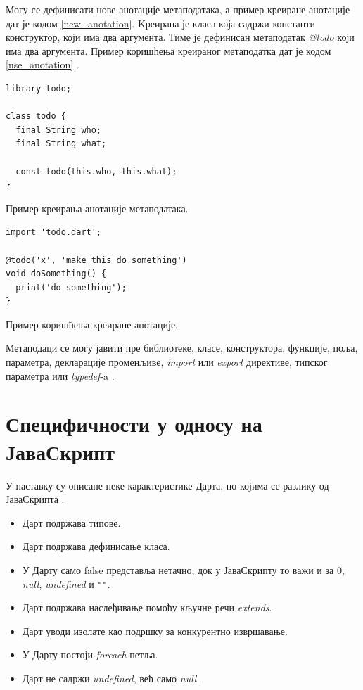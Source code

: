 \documentclass[12pt,oneside]{memoir}
\begin{document}
Могу се дефинисати нове анотације метаподатака, а пример креиране анотације дат је кодом \ref{new_anotation}. Kреирана је класа која садржи константи конструктор, који има два аргумента. Тиме је дефинисан метаподатак \textit{@todo} који има два аргумента. Пример коришћења креираног метаподатка дат је кодом \ref{use_anotation} \cite{dart, dart1}.

\begin{listing}
\begin{verbatim}
library todo;

class todo {
  final String who;
  final String what;

  const todo(this.who, this.what);
}
\end{verbatim}
\caption{Пример креирања анотације метаподатака.}
\label{new_anotation}
\end{listing}

\begin{listing}
\begin{verbatim}
import 'todo.dart';

@todo('x', 'make this do something')
void doSomething() {
  print('do something');
}
\end{verbatim}
\caption{Пример коришћења креиране анотације.}
\label{use_anotation}
\end{listing}
Метаподаци се могу јавити пре библиотеке, класе, конструктора, функције, поља, параметра, декларације променљиве, \textit{import} или \textit{export} директиве, типског параметра или \textit{typedef}-a \cite{dart, dart1}.
\section{Специфичности у односу на ЈаваСкрипт}
\label{specificnosti}
У наставку су описане неке карактеристике Дарта, по којима се разлику од ЈаваСкрипта \cite{dart, dart1}.
\begin{itemize}
\item Дарт подржава типове.
\item Дарт подржава дефинисање класа.
\item У Дарту само false представља нетачно, док у ЈаваСкрипту то важи и за 0, \textit{null}, \textit{undefined} и \verb|""|.
\item Дарт подржава наслеђивање помоћу кључне речи \textit{extends}.
\item Дарт уводи изолате као подршку за конкурентно извршавање.
\item У Дарту постоји \textit{foreach} петља.
\item Дарт не садржи \textit{undefined}, већ само \textit{null}.
\end{itemize}
\end{document}
